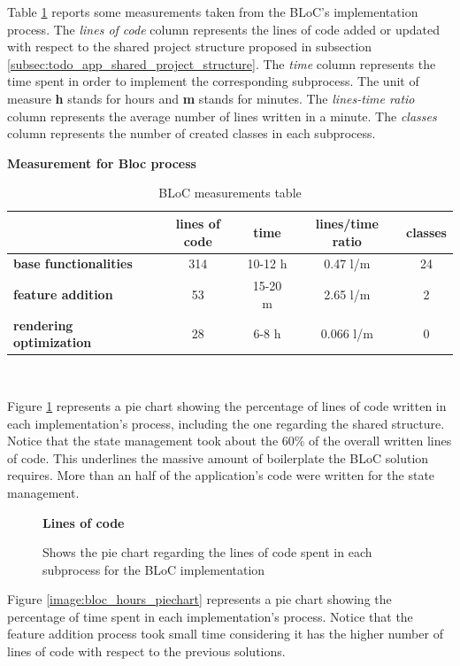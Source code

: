 Table \ref{table:recap_bloc} reports some measurements taken from the BLoC's implementation process. The \textit{lines of code} column represents the lines of code added or updated with respect to the shared project structure proposed in subsection \ref{subsec:todo_app_shared_project_structure}. The \textit{time }column represents the time spent in order to implement the corresponding subprocess. The unit of measure \textbf{h} stands for hours and \textbf{m} stands for minutes. The \textit{lines-time ratio} column represents the average number of lines written in a minute. The \textit{classes} column represents the number of created classes in each subprocess.

\begin{table}[H]
    \caption*{\textbf{Measurement for Bloc process}}
    \centering 
    \begin{tabular}{| l | c | c | c | c |}
    \hline
    \rowcolor{bluepoli!40} %
    \hline
     & \textbf{lines of code} & \textbf{time} & \textbf{lines/time ratio} & \textbf{classes} \T\B \\
    \hline
    \textbf{base functionalities} & 314 & 10-12 h & 0.47 l/m & 24 \T\B \\ 
    \textbf{feature addition} & 53 & 15-20 m & 2.65 l/m & 2 \T\B\\ 
    \textbf{rendering optimization} & 28 & 6-8 h & 0.066 l/m & 0
    \T\B\\
    \hline
    \end{tabular}
    \\[10pt]
    \caption{BLoC measurements table}
    \label{table:recap_bloc}
\end{table}

Figure \ref{image:bloc_lines_piechart} represents a pie chart showing the percentage of lines of code written in each implementation's process, including the one regarding the shared structure. Notice that the state management took about the 60\% of the overall written lines of code. This underlines the massive amount of boilerplate the BLoC solution requires. More than an half of the application's code were written for the state management.

\begin{figure}[H]

\caption*{\textbf{Lines of code}}
\centering
{}
 \caption{Shows the pie chart regarding the lines of code spent in each subprocess for the BLoC implementation}
 \label{image:bloc_lines_piechart}
\end{figure}
Figure \ref{image:bloc_hours_piechart} represents a pie chart showing the percentage of time spent in each implementation's process. Notice that the feature addition process took small time considering it has the higher number of lines of code with respect to the previous solutions.

